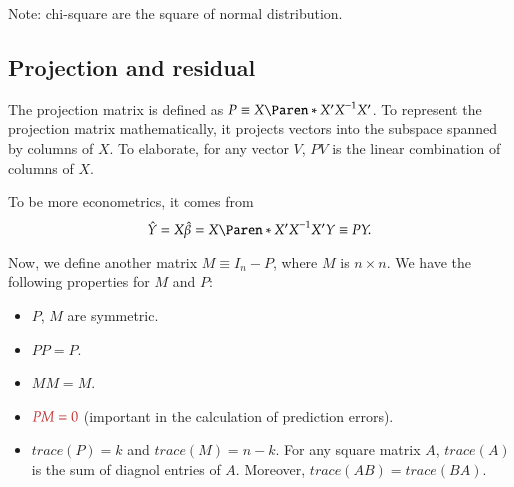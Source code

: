 \documentclass{Theme}
\begin{document}
Note: chi-square are the square of normal distribution.

\subsection{Projection and residual}
The projection matrix is defined as $P\equiv X\br{X'X}\inv X'$.
To represent the projection matrix mathematically, it projects vectors
into the subspace spanned by columns of $X$.
To elaborate, for any vector $V$, $PV$ is the linear combination of 
columns of $X$.

To be more econometrics, it comes from
\[
  \hat{Y}=X\hat{\be}=X\br{X'X}\inv X'Y\equiv PY.
\]

Now, we define another matrix $M\equiv I_n-P$, where $M$ is $n\times n$.
We have the following properties for $M$ and $P$:
\begin{itemize}
  \item $P$, $M$ are symmetric.
  \item $PP=P$.
  \item $MM=M$.
  \item $\hl{PM=0}$ (important in the calculation of prediction errors).
  \item $trace(P)=k$ and $trace(M)=n-k$.
    For any square matrix $A$, $trace(A)$ is the sum of diagnol entries of $A$.
    Moreover, $trace(AB)=trace(BA)$.
\end{itemize}
\end{document}

